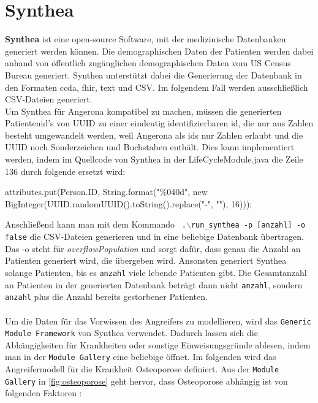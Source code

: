 \documentclass[german,version-2020-11]{uzl-thesis}
\begin{document}
\section{Synthea}
\textbf{Synthea} \cite{19,20} ist eine open-source Software, mit der medizinische Datenbanken generiert werden können. Die demographischen Daten der Patienten werden dabei anhand von öffentlich zugänglichen demographischen Daten vom US Census Bureau \cite{21} generiert. Synthea unterstützt dabei die Generierung der Datenbank in den Formaten ccda, fhir, text und CSV. Im folgendem Fall werden ausschließlich CSV-Dateien generiert.\\  Um Synthea für Angerona kompatibel zu machen, müssen die generierten Patientenid's von UUID zu einer eindeutig identifizierbaren id, die nur aus Zahlen besteht umgewandelt werden, weil Angerona als ids nur Zahlen erlaubt und die UUID noch Sonderzeichen und Buchstaben enthält. Dies kann implementiert werden, indem im Quellcode von Synthea in der LifeCycleModule.java die Zeile 136 durch folgende ersetzt wird: 
\begin{Java}
    attributes.put(Person.ID, String.format("\%040d", new BigInteger(UUID.randomUUID().toString().replace("-", ""), 16)));
\end{Java}
Anschließend kann man mit dem Kommando \texttt{ .$\backslash$run\_synthea -p [anzahl] -o false} die CSV-Dateien generieren und in eine beliebige Datenbank übertragen. Das -o steht für \textit{\textit{overflowPopulation}} und sorgt dafür, dass genau die Anzahl an Patienten generiert wird, die übergeben wird. Ansonsten generiert Synthea solange Patienten, bis es \texttt{anzahl} viele lebende Patienten gibt. Die Gesamtanzahl an Patienten in der generierten Datenbank beträgt dann nicht \texttt{anzahl}, sondern \texttt{anzahl} plus die Anzahl bereits gestorbener Patienten. \\ \\
Um die Daten für das Vorwissen des Angreifers zu modellieren, wird das \texttt{Generic Module Framework} von Synthea verwendet. Dadurch lassen sich die Abhängigkeiten für Krankheiten oder sonstige  Einweisungsgründe ablesen, indem man in der \texttt{Module Gallery} \cite{20} eine beliebige öffnet. Im folgenden  wird das Angreifermodell für die Krankheit Osteoporose definiert. 
Aus der \texttt{Module Gallery} in \autoref{fig:osteoporose} geht hervor, dass Osteoporose abhängig ist von folgenden Faktoren : 
\end{document}
